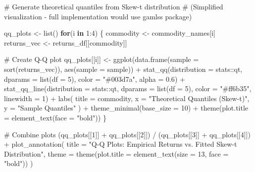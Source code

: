 \documentclass[
  10pt,
  a4paper,
]{article}
\newenvironment{Shaded}{\begin{snugshade}}{\end{snugshade}}
\newcommand{\AttributeTok}[1]{\textcolor[rgb]{0.40,0.45,0.13}{#1}}
\newcommand{\CommentTok}[1]{\textcolor[rgb]{0.37,0.37,0.37}{#1}}
\newcommand{\ControlFlowTok}[1]{\textcolor[rgb]{0.00,0.23,0.31}{\textbf{#1}}}
\newcommand{\DecValTok}[1]{\textcolor[rgb]{0.68,0.00,0.00}{#1}}
\newcommand{\FloatTok}[1]{\textcolor[rgb]{0.68,0.00,0.00}{#1}}
\newcommand{\FunctionTok}[1]{\textcolor[rgb]{0.28,0.35,0.67}{#1}}
\newcommand{\NormalTok}[1]{\textcolor[rgb]{0.00,0.23,0.31}{#1}}
\newcommand{\OtherTok}[1]{\textcolor[rgb]{0.00,0.23,0.31}{#1}}
\newcommand{\SpecialCharTok}[1]{\textcolor[rgb]{0.37,0.37,0.37}{#1}}
\newcommand{\StringTok}[1]{\textcolor[rgb]{0.13,0.47,0.30}{#1}}
\begin{document}
\begin{Shaded}
\begin{Highlighting}[]
\CommentTok{\# Generate theoretical quantiles from Skew{-}t distribution}
\CommentTok{\# (Simplified visualization {-} full implementation would use gamlss package)}

\NormalTok{qq\_plots }\OtherTok{\textless{}{-}} \FunctionTok{list}\NormalTok{()}
\ControlFlowTok{for}\NormalTok{(i }\ControlFlowTok{in} \DecValTok{1}\SpecialCharTok{:}\DecValTok{4}\NormalTok{) \{}
\NormalTok{  commodity }\OtherTok{\textless{}{-}}\NormalTok{ commodity\_names[i]}
\NormalTok{  returns\_vec }\OtherTok{\textless{}{-}}\NormalTok{ returns\_df[[commodity]]}
  
  \CommentTok{\# Create Q{-}Q plot}
\NormalTok{  qq\_plots[[i]] }\OtherTok{\textless{}{-}} \FunctionTok{ggplot}\NormalTok{(}\FunctionTok{data.frame}\NormalTok{(}\AttributeTok{sample =} \FunctionTok{sort}\NormalTok{(returns\_vec)), }
                          \FunctionTok{aes}\NormalTok{(}\AttributeTok{sample =}\NormalTok{ sample)) }\SpecialCharTok{+}
    \FunctionTok{stat\_qq}\NormalTok{(}\AttributeTok{distribution =}\NormalTok{ stats}\SpecialCharTok{::}\NormalTok{qt, }\AttributeTok{dparams =} \FunctionTok{list}\NormalTok{(}\AttributeTok{df =} \DecValTok{5}\NormalTok{), }
            \AttributeTok{color =} \StringTok{"\#003d7a"}\NormalTok{, }\AttributeTok{alpha =} \FloatTok{0.6}\NormalTok{) }\SpecialCharTok{+}
    \FunctionTok{stat\_qq\_line}\NormalTok{(}\AttributeTok{distribution =}\NormalTok{ stats}\SpecialCharTok{::}\NormalTok{qt, }\AttributeTok{dparams =} \FunctionTok{list}\NormalTok{(}\AttributeTok{df =} \DecValTok{5}\NormalTok{),}
                 \AttributeTok{color =} \StringTok{"\#ff6b35"}\NormalTok{, }\AttributeTok{linewidth =} \DecValTok{1}\NormalTok{) }\SpecialCharTok{+}
    \FunctionTok{labs}\NormalTok{(}
      \AttributeTok{title =}\NormalTok{ commodity,}
      \AttributeTok{x =} \StringTok{"Theoretical Quantiles (Skew{-}t)"}\NormalTok{,}
      \AttributeTok{y =} \StringTok{"Sample Quantiles"}
\NormalTok{    ) }\SpecialCharTok{+}
    \FunctionTok{theme\_minimal}\NormalTok{(}\AttributeTok{base\_size =} \DecValTok{10}\NormalTok{) }\SpecialCharTok{+}
    \FunctionTok{theme}\NormalTok{(}\AttributeTok{plot.title =} \FunctionTok{element\_text}\NormalTok{(}\AttributeTok{face =} \StringTok{"bold"}\NormalTok{))}
\NormalTok{\}}

\CommentTok{\# Combine plots}
\NormalTok{(qq\_plots[[}\DecValTok{1}\NormalTok{]] }\SpecialCharTok{+}\NormalTok{ qq\_plots[[}\DecValTok{2}\NormalTok{]]) }\SpecialCharTok{/}\NormalTok{ (qq\_plots[[}\DecValTok{3}\NormalTok{]] }\SpecialCharTok{+}\NormalTok{ qq\_plots[[}\DecValTok{4}\NormalTok{]]) }\SpecialCharTok{+}
  \FunctionTok{plot\_annotation}\NormalTok{(}
    \AttributeTok{title =} \StringTok{"Q{-}Q Plots: Empirical Returns vs. Fitted Skew{-}t Distribution"}\NormalTok{,}
    \AttributeTok{theme =} \FunctionTok{theme}\NormalTok{(}\AttributeTok{plot.title =} \FunctionTok{element\_text}\NormalTok{(}\AttributeTok{size =} \DecValTok{13}\NormalTok{, }\AttributeTok{face =} \StringTok{"bold"}\NormalTok{))}
\NormalTok{  )}
\end{Highlighting}
\end{Shaded}
\end{document}
